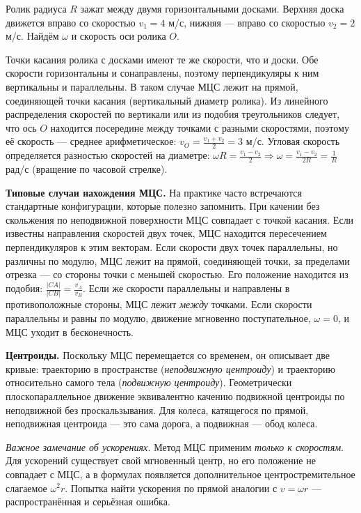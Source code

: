 \documentclass[../main.tex]{subfiles}
\begin{document}
\begin{example}
Ролик радиуса $R$ зажат между двумя горизонтальными досками.
Верхняя доска движется вправо со скоростью $v_1 = 4$ м/с,
нижняя --- вправо со скоростью $v_2 = 2$ м/с. Найдём $\omega$
и скорость оси ролика $O$.

Точки касания ролика с досками имеют те же скорости, что и доски.
Обе скорости горизонтальны и сонаправлены, поэтому перпендикуляры
к ним вертикальны и параллельны. В таком случае МЦС лежит на прямой,
соединяющей точки касания (вертикальный диаметр ролика).
Из линейного распределения скоростей по вертикали или из подобия
треугольников следует, что ось $O$ находится посередине между
точками с разными скоростями, поэтому её скорость --- среднее
арифметическое: $v_O = \frac{v_1 + v_2}{2} = 3$ м/с.
Угловая скорость определяется разностью скоростей на диаметре:
$\omega R = \frac{v_1 - v_2}{2} \Rightarrow \omega = \frac{v_1 - v_2}{2R} = \frac{1}{R}$ рад/с
(вращение по часовой стрелке).
\end{example}

\noindent\textbf{Типовые случаи нахождения МЦС.}
На практике часто встречаются стандартные конфигурации, которые полезно
запомнить. При качении без скольжения по неподвижной поверхности МЦС
совпадает с точкой касания. Если известны направления скоростей двух
точек, МЦС находится пересечением перпендикуляров к этим векторам.
Если скорости двух точек параллельны, но различны по модулю, МЦС лежит
на прямой, соединяющей точки, за пределами отрезка --- со стороны точки
с меньшей скоростью. Его положение находится из подобия:
$\frac{|CA|}{|CB|} = \frac{v_A}{v_B}$. Если же скорости параллельны и направлены
в противоположные стороны, МЦС лежит \textit{между} точками.
Если скорости параллельны и равны по модулю, движение мгновенно
поступательное, $\omega = 0$, и МЦС уходит в бесконечность.

\noindent\textbf{Центроиды.}
Поскольку МЦС перемещается со временем, он описывает две кривые:
траекторию в пространстве (\textit{неподвижную центроиду}) и траекторию
относительно самого тела (\textit{подвижную центроиду}). Геометрически
плоскопараллельное движение эквивалентно качению подвижной центроиды
по неподвижной без проскальзывания. Для колеса, катящегося по прямой,
неподвижная центроида --- это сама дорога, а подвижная --- обод колеса.

\noindent\textit{Важное замечание об ускорениях.}
Метод МЦС применим \textit{только к скоростям}. Для ускорений существует
свой мгновенный центр, но его положение не совпадает с МЦС, а в формулах
появляется дополнительное центростремительное слагаемое $\omega^2 r$.
Попытка найти ускорения по прямой аналогии с $v = \omega r$ ---
распространённая и серьёзная ошибка.
\end{document}

